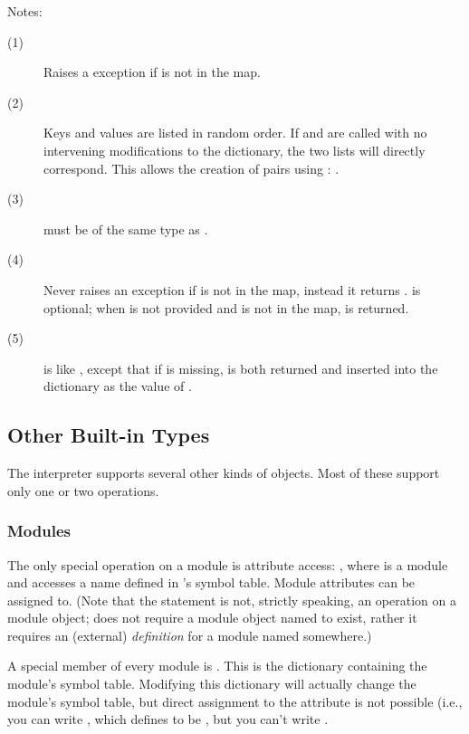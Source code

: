 \noindent
Notes:
\begin{description}
\item[(1)] Raises a  exception if  is not
in the map.

\item[(2)] Keys and values are listed in random order.  If
 and  are called with no intervening
modifications to the dictionary, the two lists will directly
correspond.  This allows the creation of  pairs using : .

\item[(3)]  must be of the same type as .

\item[(4)] Never raises an exception if  is not in the map,
instead it returns .   is optional; when  is not
provided and  is not in the map,  is returned.

\item[(5)]  is like , except
that if  is missing,  is both returned and inserted into
the dictionary as the value of .
\end{description}


\subsection{Other Built-in Types \label{typesother}}

The interpreter supports several other kinds of objects.
Most of these support only one or two operations.


\subsubsection{Modules \label{typesmodules}}

The only special operation on a module is attribute access:
, where  is a module and 
accesses a name defined in 's symbol table.  Module attributes
can be assigned to.  (Note that the  statement is not,
strictly speaking, an operation on a module object;  does not require a module object named  to exist,
rather it requires an (external) \emph{definition} for a module named
 somewhere.)

A special member of every module is .
This is the dictionary containing the module's symbol table.
Modifying this dictionary will actually change the module's symbol
table, but direct assignment to the  attribute is not
possible (i.e., you can write , which
defines  to be , but you can't write
.

